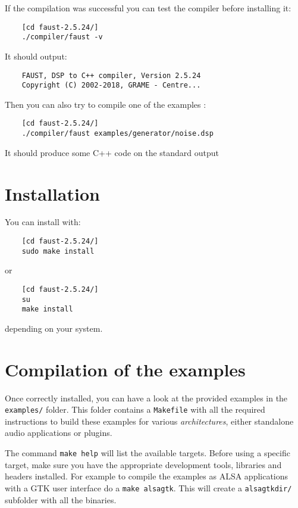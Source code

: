 If the compilation was successful you can test the compiler before installing it:
\begin{lstlisting}
	[cd faust-2.5.24/]
	./compiler/faust -v
\end{lstlisting}
It should output:
\begin{lstlisting}
	FAUST, DSP to C++ compiler, Version 2.5.24
	Copyright (C) 2002-2018, GRAME - Centre... 
\end{lstlisting}

Then you can also try to compile one of the examples :
\begin{lstlisting}
	[cd faust-2.5.24/]
	./compiler/faust examples/generator/noise.dsp
\end{lstlisting}
It should produce some C++ code on the standard output

\section{Installation}
You can install \faust with:
\begin{lstlisting}
	[cd faust-2.5.24/]
	sudo make install
\end{lstlisting}
or
\begin{lstlisting}
	[cd faust-2.5.24/]
	su
	make install
\end{lstlisting}
depending on your system.

\section{Compilation of the examples}
Once \faust correctly installed, you can have a look at the provided examples in the \lstinline'examples/' folder. This folder contains a  \lstinline'Makefile' with all the required instructions to build these examples for various \textit{architectures}, either standalone audio applications or plugins.

The command \lstinline'make help' will list the available targets. Before using a specific target, make sure you have the appropriate development tools, libraries and headers installed. For example to compile the examples as ALSA applications with a GTK user interface do a \lstinline'make alsagtk'. This will create a \lstinline'alsagtkdir/' subfolder with all the binaries. 

